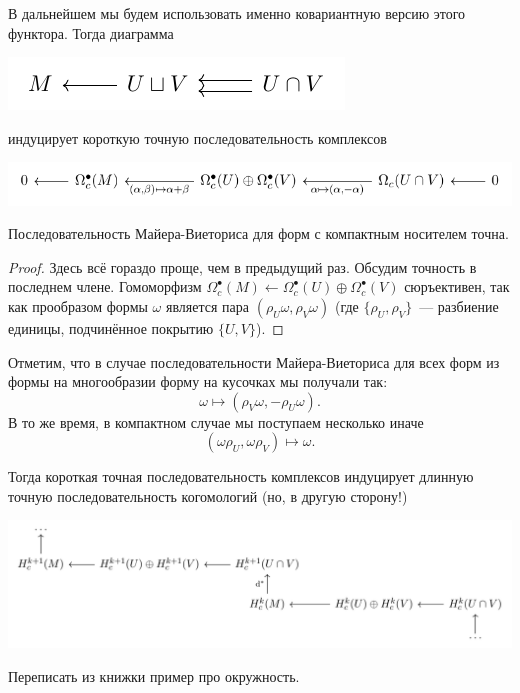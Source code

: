 	В дальнейшем мы будем использовать именно ковариантную версию этого функтора. Тогда диаграмма 
	\begin{center}
		\includegraphics{lectures/7/pictures/cd_9.pdf}
	\end{center}
	индуцирует короткую точную последовательность комплексов 

	\begin{center}
		\includegraphics{lectures/7/pictures/cd_10.pdf}
	\end{center}

	\begin{lemma} 
		Последовательность Майера-Виеториса для форм с компактным носителем точна. 
	\end{lemma}
	\begin{proof}
		Здесь всё гораздо проще, чем в предыдущий раз. Обсудим точность в последнем члене. Гомоморфизм $\Omega^{\bullet}_{c}(M) \leftarrow \Omega_{c}^{\bullet}(U) \oplus \Omega_{c}^{\bullet}(V)$ сюръективен, так как прообразом формы $\omega$ является пара $(\rho_U \omega, \rho_V \omega)$ (где $\{ \rho_U, \rho_V \}$~--- разбиение единицы, подчинённое покрытию $\{ U, V \}$). 
	\end{proof}

	\begin{remark}
		Отметим, что в случае последовательности Майера-Виеториса для всех форм из формы на многообразии форму на кусочках мы получали так: 
		\[
			\omega \mapsto (\rho_V \omega, - \rho_U \omega).
		\]
		В то же время, в компактном случае мы поступаем несколько иначе 
		\[
			(\omega \rho_U, \omega\rho_V) \mapsto \omega. 
		\]
	\end{remark}
 	  
 	Тогда короткая точная последовательность комплексов индуцирует длинную точную последовательность когомологий (но, в другую сторону!)
 	\begin{center}
 		\includegraphics{lectures/7/pictures/cd_11.pdf}
 	\end{center}

 	\begin{example}
 		Переписать из книжки пример про окружность. 
 	\end{example}

 	
 	









